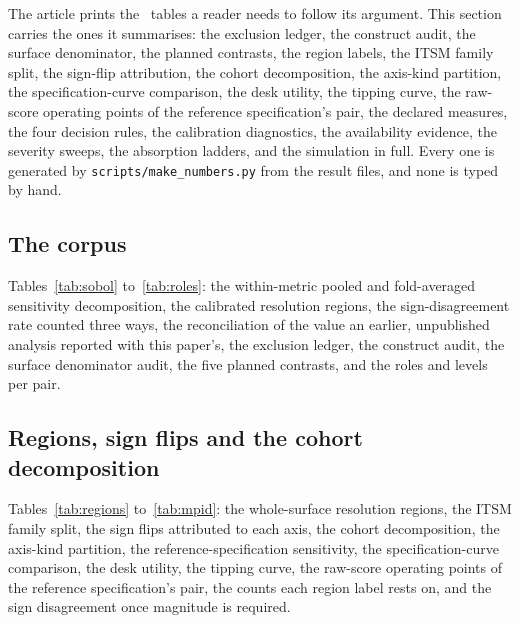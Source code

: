 The article prints the \nArticleTables\ tables a reader needs to follow its
argument.
This section carries the ones it summarises: the exclusion ledger, the
construct audit, the surface denominator, the planned contrasts, the region
labels, the ITSM family split, the sign-flip attribution, the cohort
decomposition, the axis-kind partition, the specification-curve comparison,
the desk utility, the tipping curve, the raw-score operating points of the
reference specification's pair, the declared
measures, the four decision rules, the calibration diagnostics, the
availability evidence, the severity sweeps, the absorption ladders, and the
simulation in full. Every one is generated by
\texttt{scripts/make\_numbers.py} from the result files, and none is typed by
hand.

\subsection{The corpus}

Tables~\ref{tab:sobol} to~\ref{tab:roles}: the within-metric pooled and fold-averaged
sensitivity decomposition, the calibrated resolution regions, the
sign-disagreement rate counted three ways, the reconciliation of the value an
earlier, unpublished analysis reported with this paper's, the exclusion ledger, the construct audit, the surface
denominator audit, the five planned contrasts, and the roles and levels per
pair.






















\subsection{Regions, sign flips and the cohort decomposition}

Tables~\ref{tab:regions} to~\ref{tab:mpid}: the whole-surface resolution
regions, the ITSM family split, the sign flips attributed to each axis, the
cohort decomposition, the axis-kind partition, the reference-specification
sensitivity, the specification-curve comparison, the desk utility, the
tipping curve, the raw-score operating points of the reference
specification's pair, the counts each region label rests on, and the sign
disagreement once magnitude is required.

